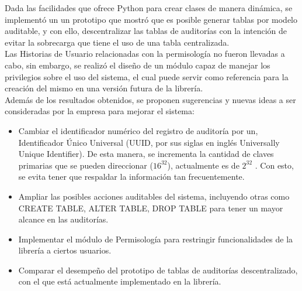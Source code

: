 Dada las facilidades que ofrece Python para crear clases de manera dinámica, se implementó un un prototipo que mostró que es posible generar tablas por modelo auditable, y con ello, descentralizar las tablas de auditorías con la intención de evitar la sobrecarga que tiene el uso de una tabla centralizada.\\

Las Historias de Usuario relacionadas con la permisología no fueron llevadas a cabo, sin embargo, se realizó el diseño de un módulo capaz de manejar los privilegios sobre el uso del sistema, el cual puede servir como referencia para la creación del mismo en una versión futura de la librería.\\

Además de los resultados obtenidos, se proponen sugerencias y nuevas ideas a ser consideradas por la empresa para mejorar el sistema:

\begin{itemize}
    \item Cambiar el identificador numérico del registro de auditoría por un, Identificador Único Universal (UUID, por sus siglas en inglés Universally Unique Identifier). De esta manera, se incrementa la cantidad de claves primarias que se pueden direccionar ($16^32$), actualmente es de $2^32$ . Con esto, se evita tener que respaldar la información tan frecuentemente.
    \item Ampliar las posibles acciones auditables del sistema, incluyendo otras como CREATE TABLE, ALTER TABLE, DROP TABLE para tener un mayor alcance en las auditorías.
    \item Implementar el módulo de Permisología para restringir funcionalidades de la librería a ciertos usuarios.
    \item Comparar el desempeño del prototipo de tablas de auditorías descentralizado, con el que está actualmente implementado en la librería.
\end{itemize}
